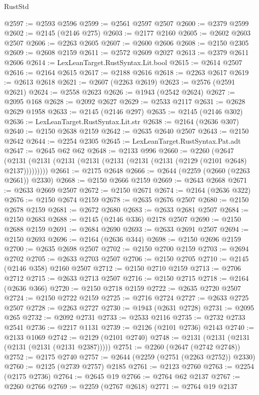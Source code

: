 \begin{lexlean}{RustStd}
\begin{coremodule}
@2597 := @2593 @2596
@2599 := @2561 @2597 @2507
@2600 := @2379 @2599
@2602 := @2145 (@2146 @275)
@2603 := @2177 @2160
@2605 := @2602 @2603 @2507
@2606 := @2263 @2605
@2607 := @2600 @2606
@2608 := @2150 @2305
@2609 := @2608 @2159
@2611 := @2572 @2609 @2027
@2613 := @2379 @2611 @2606
@2614 := LexLeanTarget.RustSyntax.Lit.bool
@2615 := @2614 @2507
@2616 := @2164 @2615
@2617 := @2188 @2616
@2618 := @2263 @2617
@2619 := @2613 @2618
@2621 := @2607 (@2263 @2619)
@2623 := @2576 (@2591 @2621)
@2624 := @2558 @2623
@2626 := @1943 (@2542 @2624)
@2627 := @2095 @168
@2628 := @2092 @2627
@2629 := @2533 @2117
@2631 := @2628 @2629 @1958
@2633 := @2145 (@2146 @297)
@2635 := @2145 (@2146 @302)
@2636 := LexLeanTarget.RustSyntax.Lit.str
@2638 := @2164 (@2636 @307)
@2640 := @2150 @2638 @2159
@2642 := @2635 @2640 @2507
@2643 := @2150 @2642
@2644 := @2254 @2305
@2645 := LexLeanTarget.RustSyntax.Pat.adt
@2647 := @2645 @62 @62
@2648 := @2133 @996
@2660 := @2260
    (@2647 (@2131 (@2131 (@2131 (@2131 (@2131 (@2131 (@2131 (@2129 (@2101 @2648) @2137)))))))))
@2661 := @2175 @2648
@2666 := @2644 (@2259 (@2660 (@2263 @2661)) @2330)
@2668 := @2150 @2666 @2159
@2669 := @2643 @2668
@2671 := @2633 @2669 @2507
@2672 := @2150 @2671
@2674 := @2164 (@2636 @322)
@2676 := @2150 @2674 @2159
@2678 := @2635 @2676 @2507
@2680 := @2150 @2678 @2159
@2681 := @2672 @2680
@2683 := @2633 @2681 @2507
@2684 := @2150 @2683
@2688 := @2145 (@2146 @336) @2178 @2507
@2690 := @2150 @2688 @2159
@2691 := @2684 @2690
@2693 := @2633 @2691 @2507
@2694 := @2150 @2693
@2696 := @2164 (@2636 @344)
@2698 := @2150 @2696 @2159
@2700 := @2635 @2698 @2507
@2702 := @2150 @2700 @2159
@2703 := @2694 @2702
@2705 := @2633 @2703 @2507
@2706 := @2150 @2705
@2710 := @2145 (@2146 @358) @2160 @2507
@2712 := @2150 @2710 @2159
@2713 := @2706 @2712
@2715 := @2633 @2713 @2507
@2716 := @2150 @2715
@2718 := @2164 (@2636 @366)
@2720 := @2150 @2718 @2159
@2722 := @2635 @2720 @2507
@2724 := @2150 @2722 @2159
@2725 := @2716 @2724
@2727 := @2633 @2725 @2507
@2728 := @2263 @2727
@2730 := @1943 (@2631 @2728)
@2731 := @2095 @265
@2732 := @2092 @2731
@2733 := @2533 @2116
@2735 := @2732 @2733 @2541
@2736 := @2217 @1131
@2739 := @2126 (@2101 @2736) @2143
@2740 := @2133 @1069
@2742 := @2129 (@2101 @2740)
@2748 := @2131 (@2131 (@2131 (@2131 (@2131 (@2131 @2387)))))
@2751 := @2260 (@2647 (@2742 @2748))
@2752 := @2175 @2740
@2757 := @2644 (@2259 (@2751 (@2263 @2752)) @2330)
@2760 := @2125 (@2739 @2757) @2185
@2761 := @2123 @2760
@2763 := @2254 (@2175 @2736)
@2764 := @2645 @19
@2766 := @2764 @62 @2137
@2767 := @2260 @2766
@2769 := @2259 (@2767 @2618)
@2771 := @2764 @19 @2137

\end{coremodule}
\end{lexlean}
